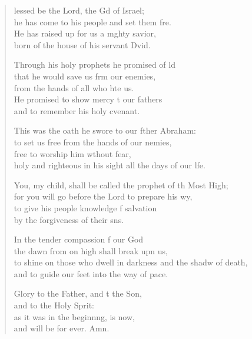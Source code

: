 \settowidth{\versewidth}{to shine on those who dwell in darkness and the shadow of death, *}
\begin{verse}%
  \begin{patverse}
lessed be the Lord, the Gd of Israel;\Med\\
he has come to his people and set them fre.\\
He has raised up for us a m\pointup{\i}ghty savior,\Med\\
born of the house of his servant Dvid.

Through his holy prophets he promised of ld\Flex\\
that he would save us frm our enemies,\Med\\
from the hands of all who hte us.\\
He promised to show mercy t our fathers\Med\\
and to remember his holy cvenant.

This was the oath he swore to our fther Abraham:\Med\\
to set us free from the hands of our nemies,\\
free to worship him w\pointup{\i}thout fear,\Med\\
holy and righteous in his sight all the days of our l\pointup{\i}fe.

You, my child, shall be called the prophet of th Most High;\Med\\
for you will go before the Lord to prepare his wy,\\
to give his people knowledge f salvation\Med\\
by the forgiveness of their s\pointup{\i}ns.

In the tender compassion f our God\Med\\
the dawn from on high shall break upn us,\\
to shine on those who dwell in darkness and the shadw of death,\Med\\
and to guide our feet into the way of pace.

Glory to the Father, and t the Son,\Med\\
and to the Holy Sp\pointup{\i}rit:\\
as it was in the beginn\pointup{\i}ng, is now,\Med\\
and will be for ever. Amn.
  \end{patverse}
  \end{verse}
